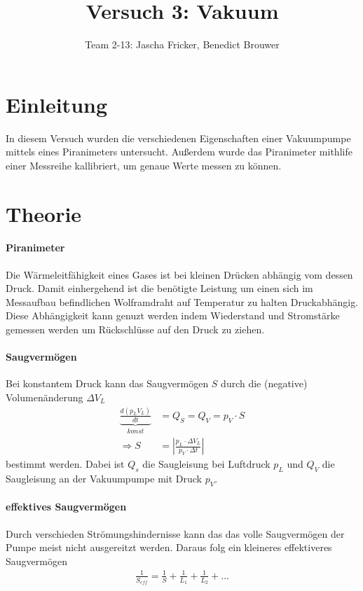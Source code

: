 \documentclass[11pt, a4paper]{article}
\title{Versuch 3: Vakuum}
\author{Team 2-13: Jascha Fricker, Benedict Brouwer}
\begin{document}
    \maketitle

    \tableofcontents

    \newpage

    \section{Einleitung}
    In diesem Versuch wurden die verschiedenen Eigenschaften einer Vakuumpumpe mittels eines Piranimeters untersucht. Außerdem wurde das Piranimeter mithlife einer Messreihe kallibriert, um genaue Werte messen zu können.

    \section{Theorie}

    \paragraph{Piranimeter}
    Die Wärmeleitfähigkeit eines Gases ist bei kleinen Drücken abhängig vom dessen Druck. Damit einhergehend ist die benötigte Leistung um einen sich im Messaufbau befindlichen Wolframdraht auf Temperatur zu halten Druckabhängig. Diese Abhängigkeit kann genuzt werden indem Wiederstand und Stromstärke gemessen werden um Rückschlüsse auf den Druck zu ziehen.

    \paragraph{Saugvermögen} Bei konstantem Druck kann das Saugvermögen $S$ durch die (negative) Volumenänderung $\Delta V_L$
    \begin{align}
        \underbrace{\frac{d(p_L V_L)}{dt}}_{konst} &= Q_S = Q_V = p_V \cdot S \\
        \Rightarrow S &= \left\lvert\frac{p_L \cdot \Delta V_L}{p_V \cdot \Delta t}\right\rvert \label{eq:saugvermoegen}
    \end{align}
    bestimmt werden. Dabei ist $Q_s$ die Saugleisung bei Luftdruck $p_L$ und $Q_V$ die Saugleisung an der Vakuumpumpe mit Druck $p_V$.

    \paragraph{effektives Saugvermögen}
    Durch verschieden Strömungshindernisse kann das das volle Saugvermögen der Pumpe meist nicht ausgereitzt werden. Daraus folg ein kleineres effektiveres Saugvermögen
    \begin{align}
        \frac{1}{S_{eff}} = \frac{1}{S} + \frac{1}{L_1} + \frac{1}{L_2} + \dots \label{seff}\\
    \end{align}
\end{document}
